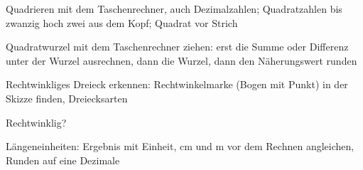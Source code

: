 \setcounter{aufgabe}{0}

\begin{aufgabe}{Quadrieren mit dem Taschenrechner, auch Dezimalzahlen; Quadratzahlen bis zwanzig hoch zwei aus dem Kopf; Quadrat vor Strich}
\end{aufgabe}

\begin{aufgabe}{Quadratwurzel mit dem Taschenrechner ziehen: erst die Summe oder Differenz unter der Wurzel ausrechnen, dann die Wurzel, dann den Näherungswert runden}
\end{aufgabe}

\begin{aufgabe}{Rechtwinkliges Dreieck erkennen: Rechtwinkelmarke (Bogen mit Punkt) in der Skizze finden, Dreiecksarten}
\begin{teile}
\teil Rechtwinklig? \janein
\end{teile}
\end{aufgabe}

\begin{aufgabe}{Längeneinheiten: Ergebnis mit Einheit, cm und m vor dem Rechnen angleichen, Runden auf eine Dezimale}
\end{aufgabe}

